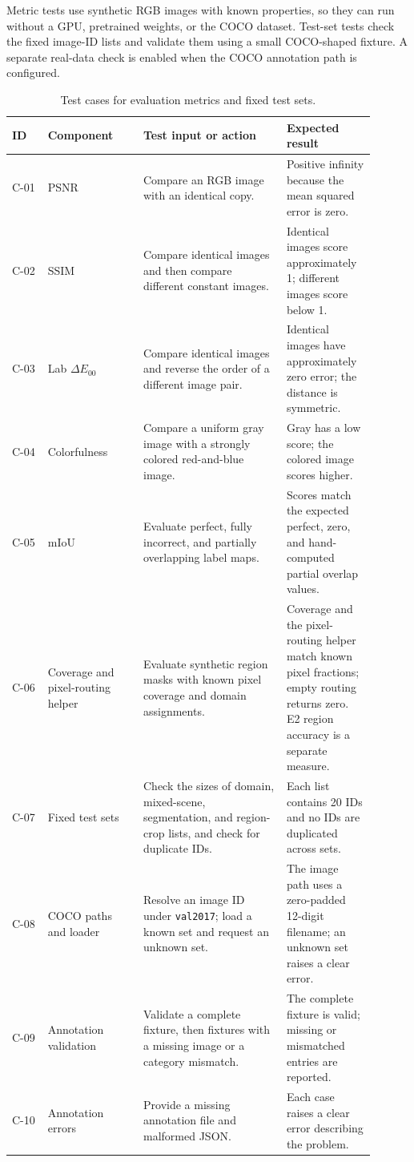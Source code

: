\documentclass{FastFyp}
\begin{document}
Metric tests use synthetic RGB images with known properties, so they can run
without a GPU, pretrained weights, or the COCO dataset. Test-set tests check
the fixed image-ID lists and validate them using a small COCO-shaped fixture.
A separate real-data check is enabled when the COCO annotation path is
configured.

\begin{table}[htbp]
\centering
\caption{Test cases for evaluation metrics and fixed test sets.}
\label{tab:person-c-test-cases}
\setlength{\tabcolsep}{5pt}
\begin{tabular}{p{0.09\linewidth}p{0.24\linewidth}p{0.36\linewidth}p{0.21\linewidth}}
\hline
ID & Component & Test input or action & Expected result\\
\hline
C-01 & PSNR & Compare an RGB image with an identical copy. & Positive infinity because the mean squared error is zero.\\
C-02 & SSIM & Compare identical images and then compare different constant images. & Identical images score approximately 1; different images score below 1.\\
C-03 & Lab $\Delta E_{00}$ & Compare identical images and reverse the order of a different image pair. & Identical images have approximately zero error; the distance is symmetric.\\
C-04 & Colorfulness & Compare a uniform gray image with a strongly colored red-and-blue image. & Gray has a low score; the colored image scores higher.\\
C-05 & mIoU & Evaluate perfect, fully incorrect, and partially overlapping label maps. & Scores match the expected perfect, zero, and hand-computed partial overlap values.\\
C-06 & Coverage and pixel-routing helper & Evaluate synthetic region masks with known pixel coverage and domain assignments. & Coverage and the pixel-routing helper match known pixel fractions; empty routing returns zero. E2 region accuracy is a separate measure.\\
C-07 & Fixed test sets & Check the sizes of domain, mixed-scene, segmentation, and region-crop lists, and check for duplicate IDs. & Each list contains 20 IDs and no IDs are duplicated across sets.\\
C-08 & COCO paths and loader & Resolve an image ID under \texttt{val2017}; load a known set and request an unknown set. & The image path uses a zero-padded 12-digit filename; an unknown set raises a clear error.\\
C-09 & Annotation validation & Validate a complete fixture, then fixtures with a missing image or a category mismatch. & The complete fixture is valid; missing or mismatched entries are reported.\\
C-10 & Annotation errors & Provide a missing annotation file and malformed JSON. & Each case raises a clear error describing the problem.\\
\hline
\end{tabular}
\end{table}
\end{document}
